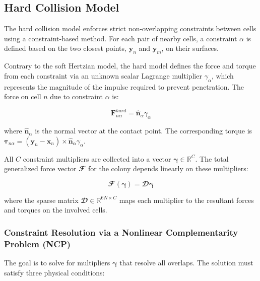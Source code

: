 \documentclass[conference]{IEEEtran}
\begin{document}
\subsection{Hard Collision Model}

The hard collision model enforces strict non-overlapping constraints between cells using a constraint-based method. For each pair of nearby cells, a constraint $\alpha$ is defined based on the two closest points, $\mathbf{y}_n$ and $\mathbf{y}_m$, on their surfaces.

Contrary to the soft Hertzian model, the hard model defines the force and torque from each constraint via an unknown scalar Lagrange multiplier $\gamma_\alpha$, which represents the magnitude of the impulse required to prevent penetration. The force on cell $n$ due to constraint $\alpha$ is:

\begin{equation} \label{eq:constraint_force}
    \mathbf{F}^{hard}_{n\alpha} = \hat{\mathbf{n}}_\alpha \gamma_\alpha
\end{equation}

where $\hat{\mathbf{n}}_\alpha$ is the normal vector at the contact point. The corresponding torque is $\boldsymbol{\tau}_{n\alpha} = (\mathbf{y}_n - \mathbf{x}_n) \times \hat{\mathbf{n}}_\alpha \gamma_\alpha$.

All $C$ constraint multipliers are collected into a vector $\boldsymbol{\gamma} \in \mathbb{R}^{C}$. The total generalized force vector $\mathbfcal{F}$ for the colony depends linearly on these multipliers:

\begin{equation}
    \mathbfcal{F}(\boldsymbol{\gamma}) = \mathbfcal{D} \boldsymbol{\gamma}
\end{equation}

where the sparse matrix $\mathbfcal{D} \in \mathbb{R}^{6N \times C}$ maps each multiplier to the resultant forces and torques on the involved cells.

\subsubsection{Constraint Resolution via a Nonlinear Complementarity Problem (NCP)}

The goal is to solve for multipliers $\boldsymbol{\gamma}$ that resolve all overlaps. The solution must satisfy three physical conditions:
\end{document}

